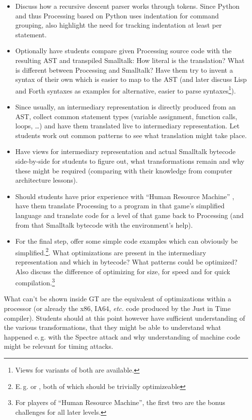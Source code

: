 \begin{instructions}
\begin{itemize}
\item Discuss how a recursive descent parser works through tokens. Since Python and thus Processing based on Python uses indentation for command grouping, also highlight the need for tracking indentation at least per statement.
\item Optionally have students compare given Processing source code with the resulting AST and transpiled Smalltalk: How literal is the translation? What is different between Processing and Smalltalk? Have them try to invent a syntax of their own which is easier to map to the AST (and later discuss Lisp and Forth syntaxes as examples for alternative, easier to parse syntaxes\footnote{Views for variants of both are available.}).
\item Since usually, an intermediary representation is directly produced from an AST, collect common statement types (variable assignment, function calls, loops, \dots) and have them translated live to intermediary representation. Let students work out common patterns to see what translation might take place.
\item Have views for intermediary representation and actual Smalltalk bytecode side-by-side for students to figure out, what transformations remain and why these might be required (comparing with their knowledge from computer architecture lessons).
\item Should students have prior experience with ``Human Resource Machine'' \cite{Tom15}, have them translate Processing to a program in that game's simplified language and translate code for a level of that game back to Processing (and from that Smalltalk bytecode with the environment's help).
\item For the final step, offer some simple code examples which can obviously be simplified.\footnote{E.\,g.  or , both of which should be trivially optimizeable}. What optimizations are present in the intermediary representation and which in bytecode? What patterns could be optimized? Also discuss the difference of optimizing for size, for speed and for quick compilation.\footnote{For players of ``Human Resource Machine'', the first two are the bonus challenges for all later levels.}
\end{itemize}
\item What can't be shown inside GT are the equivalent of optimizations within a processor (or already the x86, IA64, \emph{etc.} code produced by the Just in Time compiler). Students should at this point however have sufficient understanding of the various transformations, that they might be able to understand what happened e.\,g. with the Spectre attack \cite{Koc19} and why understanding of machine code might be relevant for timing attacks.
\end{instructions}



